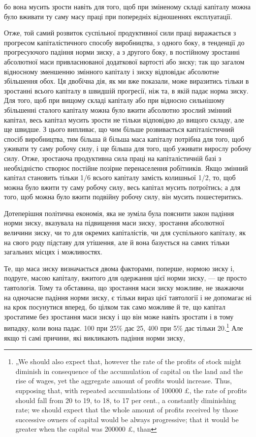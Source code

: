 бо вона мусить зрости навіть для того, щоб при зміненому
складі капіталу можна було вживати ту саму масу праці при
попередніх відношеннях експлуатації.

Отже, той самий розвиток суспільної продуктивної сили
праці виражається з прогресом капіталістичного способу виробництва,
з одного боку, в тенденції до прогресуючого падіння
норми зиску, а з другого боку, в постійному зростанні абсолютної
маси привласнюваної додаткової вартості або зиску; так
що загалом відносному зменшенню змінного капіталу і зиску
відповідає абсолютне збільшення обох. Ця двобічна дія, як ми
вже показали, може виразитись тільки в зростанні всього капіталу
в швидшій прогресії, ніж та, в якій падає норма зиску. Для
того, щоб при вищому складі капіталу або при відносно сильнішому
збільшенні сталого капіталу можна було вжити абсолютно
зрослий змінний капітал, весь капітал мусить зрости не
тільки відповідно до вищого складу, але ще швидше. З цього
випливає, що чим більше розвивається капіталістичний спосіб
виробництва, тим більша й більша маса капіталу потрібна для
того, щоб уживати ту саму робочу силу, і ще більша для того,
щоб уживати вирослу робочу силу. Отже, зростаюча продуктивна
сила праці на капіталістичній базі з необхідністю створює
постійне позірне перенаселення робітників. Якщо змінний капітал
становить тільки 1/6 всього капіталу замість колишньої
1/2, то, щоб можна було вжити ту саму робочу силу, весь
капітал мусить потроїтись; а для того, щоб можна було вжити
подвійну робочу силу, він мусить пошестеритись.

Дотеперішня політична економія, яка не зуміла була пояснити
закон падіння норми зиску, вказувала на підвищення маси
зиску, зростання абсолютної величини зиску, чи то для окремих
капіталістів, чи для суспільного капіталу, як на свого роду
підставу для утішення, але й вона базується на самих тільки
загальних місцях і можливостях.

Те, що маса зиску визначається двома факторами, поперше,
нормою зиску і, подруге, масою капіталу, вжитого для одержання
цієї норми зиску, — це просто тавтологія. Тому та обставина,
що зростання маси зиску можливе, не зважаючи на одночасне
падіння норми зиску, є тільки вираз цієї тавтології і
не допомагає ні на крок посунутися вперед, бо цілком так само
можливе й те, що капітал зростатиме без зростання маси зиску
і що він може навіть зростати і в тому випадку, коли вона
падає. 100 при 25\% дає 25, 400 при 5\% дає тільки 20.\footnote{
„We should also expect that, however the rate of the profits of stock
might diminish in consequence of the accumulation of capital on the land and the
rise of wages, yet the aggregate amount of profits would increase. Thus, supposing
that, with repeated accumulations of 100000 £, the rate of profits should fall from
20 to 19, to 18, to 17 per cent., a constantly diminishing rate; we should expect that
the whole amount of profits received by those successive owners of capital would be
always progressive; that it would be greater when the capital was 200000 £, than
} Але
якщо ті самі причини, які викликають падіння норми зиску,